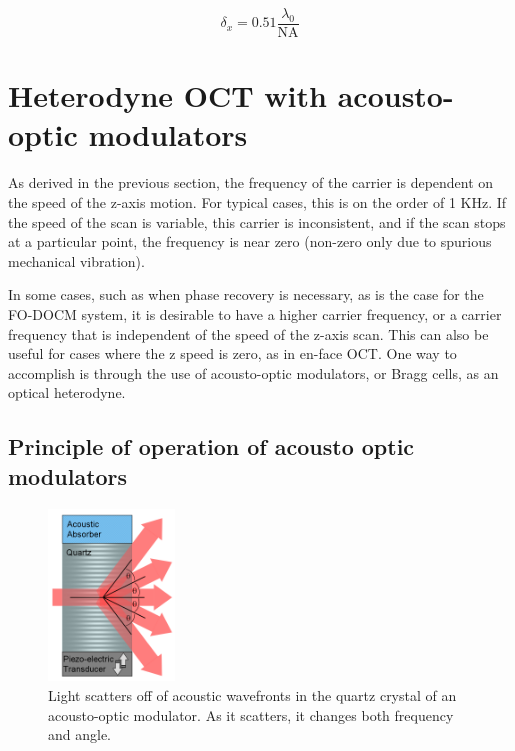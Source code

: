 \begin{equation} \label{eq:tres}
\delta_x = 0.51 \frac{\lambda_0}{\mathrm{NA}}
\end{equation}

\section{Heterodyne OCT with acousto-optic modulators}

As derived in the previous section, the frequency of the carrier is dependent on the speed of the z-axis motion. For typical cases, this is on the order of 1 KHz. If the speed of the scan is variable, this carrier is inconsistent, and if the scan stops at a particular point, the frequency is near zero (non-zero only due to spurious mechanical vibration).

In some cases, such as when phase recovery is necessary, as is the case for the FO-DOCM system, it is desirable to have a higher carrier frequency, or a carrier frequency that is independent of the speed of the z-axis scan. This can also be useful for cases where the z speed is zero, as in en-face OCT. One way to accomplish is through the use of acousto-optic modulators, or Bragg cells, as an optical heterodyne. \cite{bouma} \cite{hitzenberger}

\subsection{Principle of operation of acousto optic modulators}

\begin{figure}[h!]
\centering
\includegraphics[width=0.3\textwidth]{Images/Background/aom.png}
\caption[Light scatters off of acoustic wavefronts in an acousto-optic modulator.]{Light scatters off of acoustic wavefronts in the quartz crystal of an acousto-optic modulator. As it scatters, it changes both frequency and angle.}
\end{figure}

